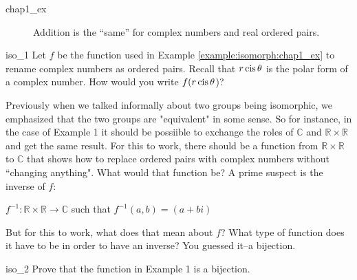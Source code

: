 \begin{example}{chap1_ex}
\begin{figure}[htb]
	  \caption{\label{fig:groups:CommDiag} Addition is the ``same'' for complex numbers and real ordered pairs. }
\end{figure}

\end{example}

\begin{exercise}{iso_1}
Let $f$ be  the function used in Example \ref{example:isomorph:chap1_ex} to rename complex numbers as ordered pairs. Recall that $r \operatorname{cis} \theta$ is the polar form of a complex number. How would you write $f(r \operatorname{cis} \theta$)?
\end{exercise}

Previously when we talked informally about two groups being isomorphic, we emphasized that  the two groups are "equivalent"  in some sense.  So for instance, in the case of Example 1 it should be possiible to exchange the roles of  ${\mathbb C}$ and ${\mathbb R} \times {\mathbb R}$ and get the same result.  For this to work, there should  be a function from ${\mathbb R} \times {\mathbb R}$ to ${\mathbb C}$  that shows how to replace ordered pairs with complex numbers without ``changing anything".  What would that function be?  A prime suspect is the inverse of $f$:

\begin{center}
$f^{-1} : {\mathbb R} \times {\mathbb R} \longrightarrow {\mathbb C}$ such that $f^{-1}(a,b) = (a + bi)$
\end{center}

But for this to work,  what does that mean about $f$?  What type of function does it have to be in order to have an inverse?  You guessed it--a bijection.

\begin{exercise}{iso_2}
Prove that the function in Example 1 is a bijection.
\end{exercise}

